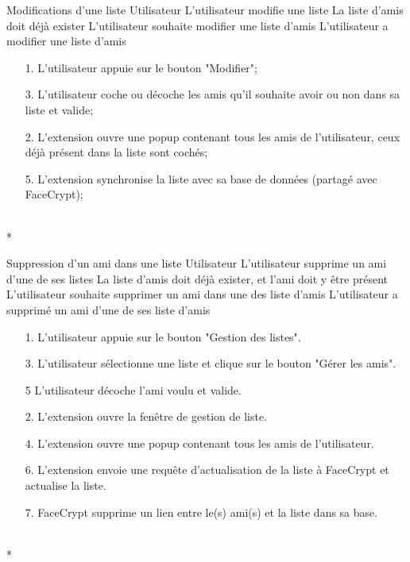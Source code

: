 \documentclass[a4paper,11pt,french]{article}
\begin{document}
\fiche
	{Modifications d'une liste}
	{Utilisateur}
    {L'utilisateur modifie une liste}
    {La liste d'amis doit déjà exister}
    {L'utilisateur souhaite modifier une liste d'amis}
	{L'utilisateur a modifier une liste d'amis}
    {\begin{itemize}
        \item[]
        \item[1.] L'utilisateur appuie sur le bouton "Modifier";
        \item[3.] L'utilisateur coche ou décoche les amis qu'il souhaite
        avoir ou non dans sa liste et valide;
    \end{itemize}}
	{\begin{itemize}
        \item[]
		\item[2.] L'extension ouvre une popup contenant tous les amis de 
		l'utilisateur, ceux déjà présent dans la liste sont cochés;
		\item[5.] L'extension synchronise la liste avec sa base de données
            (partagé avec FaceCrypt);
	\end{itemize}
	}
	{}
\flots
    {\begin{itemize}
    \item[]
    \end{itemize}
    }
    {}
\\*

\fiche
	{Suppression d'un ami dans une liste}
	{Utilisateur}
    {L'utilisateur supprime un ami d'une de ses listes}
    {La liste d'amis doit déjà exister, et l'ami doit y être présent}
    {L'utilisateur souhaite supprimer un ami dans une des liste d'amis}
	{L'utilisateur a supprimé un ami d'une de ses liste d'amis}
    {\begin{itemize}
        \item[]
        \item[1.] L'utilisateur appuie sur le bouton "Gestion des listes".
        \item[3.] L'utilisateur sélectionne une liste et clique sur le bouton 
        "Gérer les amis".
        \item[5] L'utilisateur décoche l'ami voulu et valide.
    \end{itemize}}
	{\begin{itemize}
        \item[]
        \item[2.] L'extension ouvre la fenêtre de gestion de liste.
		\item[4.] L'extension ouvre une popup contenant tous les amis de 
		l'utilisateur.
		\item[6.] L'extension envoie une requête d'actualisation de la liste à 
		FaceCrypt et actualise la liste.
		\item[7.] FaceCrypt supprime un lien entre le(s) ami(s) et la liste
		dans sa base.
	\end{itemize}
	}
	{}
\flots
    {}
    {}
\\*
\end{document}
